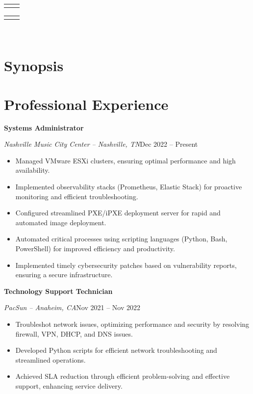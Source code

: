 \documentclass[a4paper]{article}
\makeatletter
\renewcommand{\maketitle}{
  \begin{widebox}
    {\bfseries\LARGE\textsf\theauthor} \\
    \medskip{}
    \begin{tabular}{@{}c|c@{}}
        \faIcon{linkedin} \textsf{\applinkedinurl{}} & \faIcon{github} \textsf{\appgithuburl{}}
    \end{tabular}
    \begin{tabular}{@{}c|c@{}}
        \faIcon{mobile} \textsf{\appcellphone{}} & \faIcon{envelope} \textsf{\appemail{}}
    \end{tabular} \\
    \medskip{}
    \faIcon{home} \textsf{\appaddress{}}
  \end{widebox}
}
\makeatother
\begin{document}
\author{\textsf{\appfirstname{} \applastname{}}}

\maketitle

\section{Synopsis}

\begin{center}
    \appsynopsis{}
\end{center}

\section{Professional Experience}
\textbf{Systems Administrator}\par
\textit{Nashville Music City Center -- Nashville, TN}\hfill Dec 2022 -- Present

\begin{itemize}[noitemsep,nolistsep]
    \item Managed VMware ESXi clusters, ensuring optimal performance and high availability.
    \item Implemented observability stacks (Prometheus, Elastic Stack) for proactive monitoring and efficient troubleshooting.
    \item Configured streamlined PXE/iPXE deployment server for rapid and automated image deployment.
    \item Automated critical processes using scripting languages (Python, Bash, PowerShell) for improved efficiency and productivity.
    \item Implemented timely cybersecurity patches based on vulnerability reports, ensuring a secure infrastructure.
\end{itemize}

\vspace{0.5em}
\textbf{Technology Support Technician}\par
\textit{PacSun -- Anaheim, CA}\hfill Nov 2021 -- Nov 2022

\begin{itemize}[noitemsep,nolistsep]
    \item Troubleshot network issues, optimizing performance and security by resolving firewall, VPN, DHCP, and DNS issues.
    \item Developed Python scripts for efficient network troubleshooting and streamlined operations.
    \item Achieved SLA reduction through efficient problem-solving and effective support, enhancing service delivery.
\end{itemize}
\end{document}
